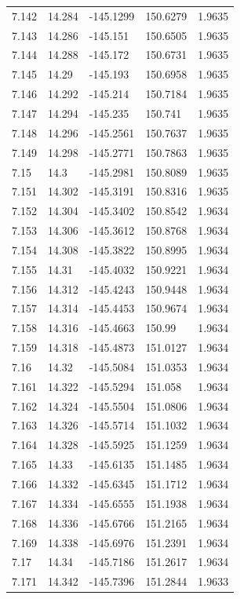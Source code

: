 \begin{tabular}{lllll}
7.142 & 14.284 & -145.1299 & 150.6279 & 1.9635 \\
7.143 & 14.286 & -145.151 & 150.6505 & 1.9635 \\
7.144 & 14.288 & -145.172 & 150.6731 & 1.9635 \\
7.145 & 14.29 & -145.193 & 150.6958 & 1.9635 \\
7.146 & 14.292 & -145.214 & 150.7184 & 1.9635 \\
7.147 & 14.294 & -145.235 & 150.741 & 1.9635 \\
7.148 & 14.296 & -145.2561 & 150.7637 & 1.9635 \\
7.149 & 14.298 & -145.2771 & 150.7863 & 1.9635 \\
7.15 & 14.3 & -145.2981 & 150.8089 & 1.9635 \\
7.151 & 14.302 & -145.3191 & 150.8316 & 1.9635 \\
7.152 & 14.304 & -145.3402 & 150.8542 & 1.9634 \\
7.153 & 14.306 & -145.3612 & 150.8768 & 1.9634 \\
7.154 & 14.308 & -145.3822 & 150.8995 & 1.9634 \\
7.155 & 14.31 & -145.4032 & 150.9221 & 1.9634 \\
7.156 & 14.312 & -145.4243 & 150.9448 & 1.9634 \\
7.157 & 14.314 & -145.4453 & 150.9674 & 1.9634 \\
7.158 & 14.316 & -145.4663 & 150.99 & 1.9634 \\
7.159 & 14.318 & -145.4873 & 151.0127 & 1.9634 \\
7.16 & 14.32 & -145.5084 & 151.0353 & 1.9634 \\
7.161 & 14.322 & -145.5294 & 151.058 & 1.9634 \\
7.162 & 14.324 & -145.5504 & 151.0806 & 1.9634 \\
7.163 & 14.326 & -145.5714 & 151.1032 & 1.9634 \\
7.164 & 14.328 & -145.5925 & 151.1259 & 1.9634 \\
7.165 & 14.33 & -145.6135 & 151.1485 & 1.9634 \\
7.166 & 14.332 & -145.6345 & 151.1712 & 1.9634 \\
7.167 & 14.334 & -145.6555 & 151.1938 & 1.9634 \\
7.168 & 14.336 & -145.6766 & 151.2165 & 1.9634 \\
7.169 & 14.338 & -145.6976 & 151.2391 & 1.9634 \\
7.17 & 14.34 & -145.7186 & 151.2617 & 1.9634 \\
7.171 & 14.342 & -145.7396 & 151.2844 & 1.9633 \\

\end{tabular}
